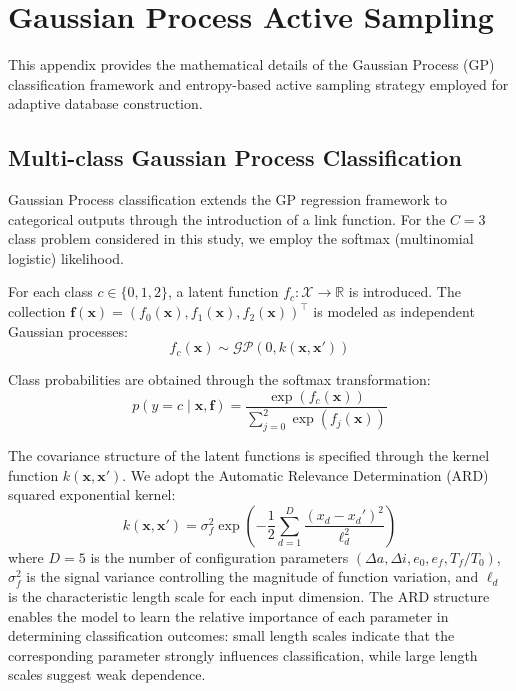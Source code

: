 \documentclass[a4paper,fleqn]{cas-dc}
\let\origsubsection\subsection
\renewcommand{\subsection}{\FloatBarrier\origsubsection}
\begin{document}
\appendix
\section{Gaussian Process Active Sampling}\label{app:gp_sampling}

This appendix provides the mathematical details of the Gaussian Process (GP) classification framework and entropy-based active sampling strategy employed for adaptive database construction.

\subsection{Multi-class Gaussian Process Classification}

Gaussian Process classification extends the GP regression framework to categorical outputs through the introduction of a link function. For the $C = 3$ class problem considered in this study, we employ the softmax (multinomial logistic) likelihood.

For each class $c \in \{0, 1, 2\}$, a latent function $f_c: \mathcal{X} \rightarrow \mathbb{R}$ is introduced. The collection $\mathbf{f}(\mathbf{x}) = (f_0(\mathbf{x}), f_1(\mathbf{x}), f_2(\mathbf{x}))^\top$ is modeled as independent Gaussian processes:
\begin{equation}
f_c(\mathbf{x}) \sim \mathcal{GP}(0, k(\mathbf{x}, \mathbf{x}'))
\end{equation}

Class probabilities are obtained through the softmax transformation:
\begin{equation}\label{eq:softmax}
p(y = c \mid \mathbf{x}, \mathbf{f}) = \frac{\exp(f_c(\mathbf{x}))}{\sum_{j=0}^{2} \exp(f_j(\mathbf{x}))}
\end{equation}

The covariance structure of the latent functions is specified through the kernel function $k(\mathbf{x}, \mathbf{x}')$. We adopt the Automatic Relevance Determination (ARD) squared exponential kernel:
\begin{equation}\label{eq:ard_kernel}
k(\mathbf{x}, \mathbf{x}') = \sigma_f^2 \exp\left(-\frac{1}{2} \sum_{d=1}^{D} \frac{(x_d - x_d')^2}{\ell_d^2}\right)
\end{equation}
where $D = 5$ is the number of configuration parameters $(\Delta a, \Delta i, e_0, e_f, T_f/T_0)$, $\sigma_f^2$ is the signal variance controlling the magnitude of function variation, and $\ell_d$ is the characteristic length scale for each input dimension. The ARD structure enables the model to learn the relative importance of each parameter in determining classification outcomes: small length scales indicate that the corresponding parameter strongly influences classification, while large length scales suggest weak dependence.
\end{document}
